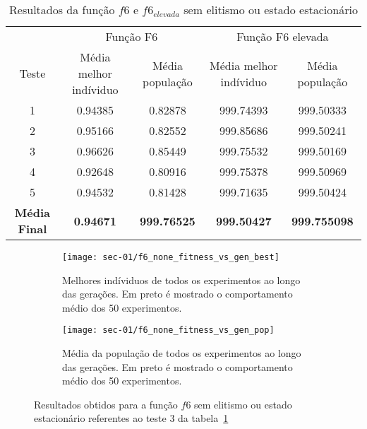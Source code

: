 \begin{table}[htb]
	\centering
	\begin{tabular}{|c|c|c|c|c|}
		\hline
		\rowcolor[HTML]{9B9B9B}
		& \multicolumn{2}{c}{Função F6} & \multicolumn{2}{c}{Função F6 elevada} \\
		\rowcolor[HTML]{9B9B9B}
		Teste & Média melhor indíviduo & Média população & Média melhor indíviduo & Média população \\\hline
		1 & 0.94385 & 0.82878 & 999.74393 & 999.50333 \\\hline
		2 & 0.95166 & 0.82552 & 999.85686 & 999.50241 \\\hline
		3 & 0.96626 & 0.85449 & 999.75532 & 999.50169 \\\hline
		4 & 0.92648 & 0.80916 & 999.75378 & 999.50969 \\\hline
		5 & 0.94532 & 0.81428 & 999.71635 & 999.50424 \\\hline
		\textbf{Média Final} & \textbf{0.94671} & \textbf{999.76525} & \textbf{999.50427} & \textbf{999.755098} \\\hline
	\end{tabular}
	\caption{Resultados da função $f6$ e $f6_{elevada}$ sem elitismo ou estado
	estacionário \label{tab:f6_none}}
\end{table}

\begin{figure}[!htb]
	\begin{subfigure}{.45\textwidth}
		\centering
		\texttt{[image: sec-01/f6\_none\_fitness\_vs\_gen\_best]}
		\caption{Melhores indíviduos de todos os experimentos ao longo das gerações.
		Em preto é mostrado o comportamento médio dos 50 experimentos. }
	\end{subfigure}
	\hfill
	\begin{subfigure}{.45\textwidth}
		\centering
		\texttt{[image: sec-01/f6\_none\_fitness\_vs\_gen\_pop]}
		\caption{Média da população de todos os experimentos ao longo das gerações.
		Em preto é mostrado o comportamento médio dos 50 experimentos.}
	\end{subfigure}
	\caption{Resultados obtidos para a função $f6$ sem elitismo ou estado estacionário referentes ao teste 3 da tabela~\ref{tab:f6_none}}
\end{figure}

